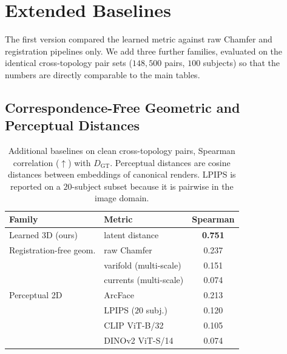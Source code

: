 \documentclass{article}
\begin{document}
\section{Extended Baselines}
\label{sec:supp_baselines}

The first version compared the learned metric against raw Chamfer and registration
pipelines only. We add three further families, evaluated on the identical cross-topology
pair sets ($148{,}500$ pairs, $100$ subjects) so that the numbers are directly
comparable to the main tables.

\subsection{Correspondence-Free Geometric and Perceptual Distances}

\begin{table}[!ht]
\centering
\small
\caption{Additional baselines on clean cross-topology pairs, Spearman correlation
($\uparrow$) with $D_{\mathrm{GT}}$. Perceptual distances are cosine distances between
embeddings of canonical renders. LPIPS is reported on a $20$-subject subset because it
is pairwise in the image domain.}
\label{tab:supp_baselines}
\begin{tabular}{llc}
\toprule
Family & Metric & Spearman \\
\midrule
Learned 3D (ours)      & latent distance          & \textbf{0.751} \\
\midrule
Registration-free geom.& raw Chamfer              & 0.237 \\
                       & varifold (multi-scale)   & 0.151 \\
                       & currents (multi-scale)   & 0.074 \\
\midrule
Perceptual 2D          & ArcFace                  & 0.213 \\
                       & LPIPS ($20$ subj.)       & 0.120 \\
                       & CLIP ViT-B/32            & 0.105 \\
                       & DINOv2 ViT-S/14          & 0.074 \\
\bottomrule
\end{tabular}
\end{table}
\end{document}
